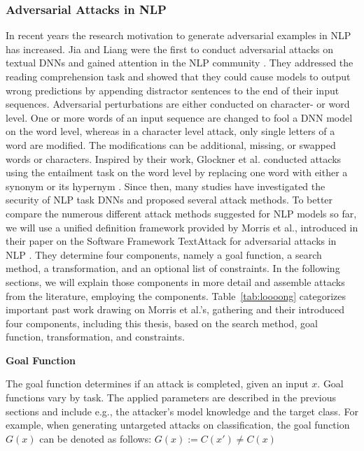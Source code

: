 \subsubsection{Adversarial Attacks in NLP}
\label{sec:adv-ex_in_NLP}

In recent years the research motivation to generate adversarial examples in NLP has increased. Jia and Liang were the first to conduct adversarial attacks on textual DNNs and gained attention in the NLP community \cite{Jia2017AdversarialEF}. They addressed the reading comprehension task and showed that they could cause models to output wrong predictions by appending distractor sentences to the end of their input sequences.
Adversarial perturbations are either conducted on character- or word level. One or more words of an input sequence are changed to fool a DNN model on the word level, whereas in a character level attack, only single letters of a word are modified. The modifications can be additional, missing, or swapped words or characters. 
Inspired by their work, Glockner et al. conducted attacks using the entailment task on the word level by replacing one word with either a synonym or its hypernym \cite{glockner2018breaking}. Since then, many studies have investigated the security of NLP task DNNs and proposed several attack methods. 
To better compare the numerous different attack methods suggested for NLP models so far, we will use a unified definition framework provided by Morris et al., introduced in their paper on the Software Framework TextAttack for adversarial attacks in NLP \cite{morris2020textattack}. They determine four components, namely a goal function, a search method, a transformation, and an optional list of constraints. In the following sections, we will explain those components in more detail and assemble attacks from the literature, employing the components.
Table~\ref{tab:loooong} categorizes important past work drawing on Morris et al.'s, gathering and their introduced four components, including this thesis, based on the search method, goal function, transformation, and constraints.

\textbf{Goal Function}
\label{sec:goal_funciton}

The goal function determines if an attack is completed, given an input $x$. 
Goal functions vary by task. The applied parameters are described in the previous sections and include e.g., the attacker's model knowledge and the target class.
For example, when generating untargeted attacks on classification, the goal function $G(x)$ can be denoted as follows:
$G(x):= C(x') \neq C(x)$

